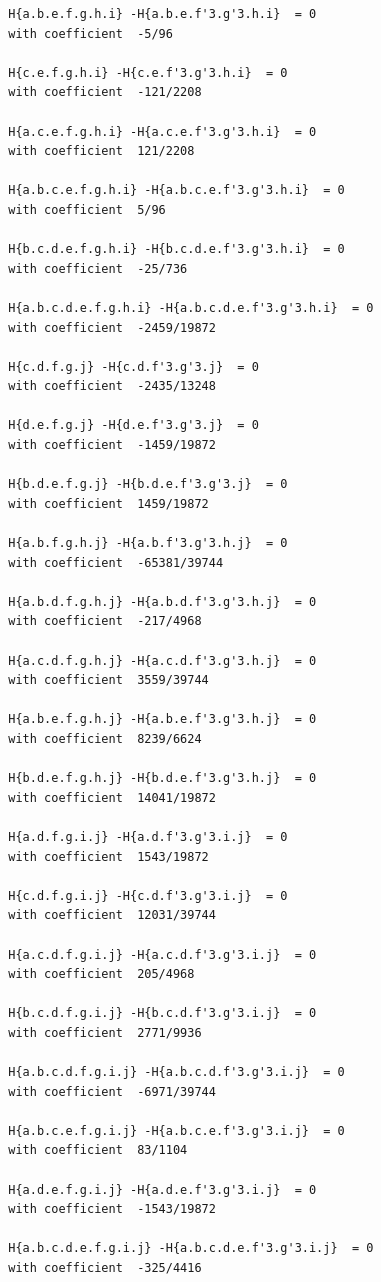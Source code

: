\documentclass[11pt, a4paper]{kybernetika}
\begin{document}
\begin{verbatim}
		H{a.b.e.f.g.h.i} -H{a.b.e.f'3.g'3.h.i}  = 0
		with coefficient  -5/96
		
		H{c.e.f.g.h.i} -H{c.e.f'3.g'3.h.i}  = 0
		with coefficient  -121/2208
		
		H{a.c.e.f.g.h.i} -H{a.c.e.f'3.g'3.h.i}  = 0
		with coefficient  121/2208
		
		H{a.b.c.e.f.g.h.i} -H{a.b.c.e.f'3.g'3.h.i}  = 0
		with coefficient  5/96
		
		H{b.c.d.e.f.g.h.i} -H{b.c.d.e.f'3.g'3.h.i}  = 0
		with coefficient  -25/736
		
		H{a.b.c.d.e.f.g.h.i} -H{a.b.c.d.e.f'3.g'3.h.i}  = 0
		with coefficient  -2459/19872
		
		H{c.d.f.g.j} -H{c.d.f'3.g'3.j}  = 0
		with coefficient  -2435/13248
		
		H{d.e.f.g.j} -H{d.e.f'3.g'3.j}  = 0
		with coefficient  -1459/19872
		
		H{b.d.e.f.g.j} -H{b.d.e.f'3.g'3.j}  = 0
		with coefficient  1459/19872
		
		H{a.b.f.g.h.j} -H{a.b.f'3.g'3.h.j}  = 0
		with coefficient  -65381/39744
		
		H{a.b.d.f.g.h.j} -H{a.b.d.f'3.g'3.h.j}  = 0
		with coefficient  -217/4968
		
		H{a.c.d.f.g.h.j} -H{a.c.d.f'3.g'3.h.j}  = 0
		with coefficient  3559/39744
		
		H{a.b.e.f.g.h.j} -H{a.b.e.f'3.g'3.h.j}  = 0
		with coefficient  8239/6624
		
		H{b.d.e.f.g.h.j} -H{b.d.e.f'3.g'3.h.j}  = 0
		with coefficient  14041/19872
		
		H{a.d.f.g.i.j} -H{a.d.f'3.g'3.i.j}  = 0
		with coefficient  1543/19872
		
		H{c.d.f.g.i.j} -H{c.d.f'3.g'3.i.j}  = 0
		with coefficient  12031/39744
		
		H{a.c.d.f.g.i.j} -H{a.c.d.f'3.g'3.i.j}  = 0
		with coefficient  205/4968
		
		H{b.c.d.f.g.i.j} -H{b.c.d.f'3.g'3.i.j}  = 0
		with coefficient  2771/9936
		
		H{a.b.c.d.f.g.i.j} -H{a.b.c.d.f'3.g'3.i.j}  = 0
		with coefficient  -6971/39744
		
		H{a.b.c.e.f.g.i.j} -H{a.b.c.e.f'3.g'3.i.j}  = 0
		with coefficient  83/1104
		
		H{a.d.e.f.g.i.j} -H{a.d.e.f'3.g'3.i.j}  = 0
		with coefficient  -1543/19872
		
		H{a.b.c.d.e.f.g.i.j} -H{a.b.c.d.e.f'3.g'3.i.j}  = 0
		with coefficient  -325/4416
		

\end{verbatim}
\end{document}
